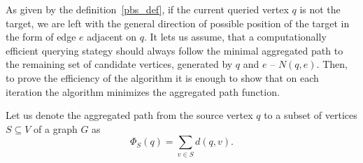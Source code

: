 As given by the definition~\ref{pbs_def}, if the current queried vertex $q$ is not the target, we are left with the general direction of possible position of the target in the form of edge $e$ adjacent on $q$. It lets us assume, that a computationally efficient querying stategy should always follow the minimal aggregated path to the remaining set of candidate vertices, generated by $q$ and $e$ -- $N(q, e)$. Then, to prove the efficiency of the algorithm it is enough to show that on each iteration the algorithm minimizes the aggregated path function.


\begin{definition}
Let us denote the aggregated path from the source vertex $q$ to a subset of vertices $S \subseteq V$ of a graph $G$ as
	\[\Phi_S(q) = \sum \limits_{v \in S} d(q, v).\]
\end{definition}


